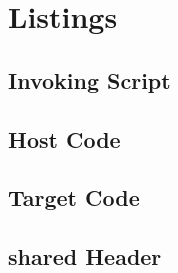 \chapter{Listings}

\section{Invoking Script}

\lstset{language=bash}


\section{Host Code}

\lstset{language=C}


\section{Target Code}

\lstset{language=C}


\section{shared Header}

\lstset{language=C}

